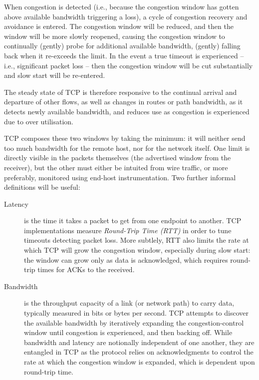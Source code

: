 \documentclass[a4paper,10pt]{article}
\begin{document}
\begin{description}
  When congestion is detected (i.e., because the congestion window has gotten
  above available bandwidth triggering a loss), a cycle of congestion recovery
  and avoidance is entered.
  The congestion window will be reduced, and then the window will be more
  slowly reopened, causing the congestion window to continually (gently) probe
  for additional available bandwidth, (gently) falling back when it re-exceeds
  the limit.
  In the event a true timeout is experienced -- i.e., significant packet loss
  -- then the congestion window will be cut substantially and slow start will
  be re-entered.

  The steady state of TCP is therefore responsive to the continual arrival and
  departure of other flows, as well as changes in routes or path bandwidth, as
  it detects newly available bandwidth, and reduces use as congestion is
  experienced due to over utilisation.
\end{description}

TCP composes these two windows by taking the minimum: it will neither send too
much bandwidth for the remote host, nor for the network itself.
One limit is directly visible in the packets themselves (the advertised
window from the receiver), but the other must either be intuited from wire
traffic, or more preferably, monitored using end-host instrumentation.
Two further informal definitions will be useful:

\begin{description}
\item[Latency] is the time it takes a packet to get from one endpoint to
  another.
  TCP implementations measure \textit{Round-Trip Time (RTT)} in order to tune
  timeouts detecting packet loss.
  More subtlely, RTT also limits the rate at which TCP will grow the
  congestion window, especially during slow start: the window can grow only as
  data is acknowledged, which requires round-trip times for ACKs to the
  received.

\item[Bandwidth] is the throughput capacity of a link (or network path) to
  carry data, typically measured in bits or bytes per second.
  TCP attempts to discover the available bandwidth by iteratively expanding
  the congestion-control window until congestion is experienced, and then
  backing off.
  While bandwidth and latency are notionally independent of one another, they
  are entangled in TCP as the protocol relies on acknowledgments to control
  the rate at which the congestion window is expanded, which is dependent upon
  round-trip time.
\end{description}
\end{document}
